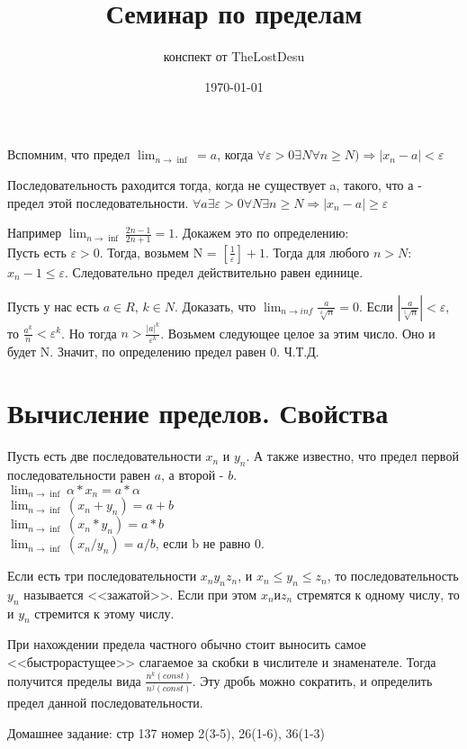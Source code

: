 \documentclass[a4paper,12pt]{article}
\author{конспект от TheLostDesu}
\title{Семинар по пределам}
\date{\today}
\begin{document}
\maketitle
Вспомним, что предел $\lim_{n \to \inf} = a$, когда $\forall \varepsilon > 0 \exists N \forall n \geq N)\Rightarrow  |x_n - a|<\varepsilon$ 

Последовательность раходится тогда, когда не существует a, такого, что а - предел этой последовательности. $\forall a \exists \varepsilon > 0 \forall N \exists n \geq N \Rightarrow |x_n - a| \geq \varepsilon$

Например $\lim_{n \to \inf} \frac{2n - 1}{2n + 1} = 1$. Докажем это по определению:\\
Пусть есть $\varepsilon > 0$.  Тогда, возьмем N = $\left[ \frac{1}{\varepsilon} \right] + 1$. Тогда для любого $n > N$: $x_n - 1 \leq \varepsilon$. Следовательно предел действительно равен единице.

Пусть у нас есть $a \in R$, $k \in N$. Доказать, что $\lim_{n \to inf} \frac{a}{\sqrt[k]{n}} = 0$. Если $|\frac{a}{\sqrt[5]{n}}| < \varepsilon$, то $\frac{a^k}{n} < \varepsilon ^ k$. Но тогда $n > \frac{|a|^k}{\varepsilon ^ k}$. Возьмем следующее целое за этим число. Оно и будет N. Значит, по определению предел равен 0. Ч.Т.Д.

\section*{Вычисление пределов. Свойства}
Пусть есть две последовательности $x_n$ и $y_n$. А также известно, что предел первой последовательности равен $a$, а второй - $b$. \\
$\lim_{n \to \inf} \alpha * x_n = a * \alpha$\\
$\lim_{n \to \inf} (x_n + y_n) = a + b$\\
$\lim_{n \to \inf} (x_n * y_n) = a * b$\\
$\lim_{n \to \inf} (x_n / y_n) = a / b$, если b не равно 0.

Если есть три последовательности $x_n y_n z_n$, и $x_n \leq y_n \leq z_n$, то последовательность $y_n$ называется <<зажатой>>. 	Если при этом $x_n и z_n$ стремятся к одному числу, то и $y_n$ стремится к этому числу.

При нахождении предела частного обычно стоит выносить самое <<быстрорастущее>> слагаемое за скобки в числителе и знаменателе. Тогда получится пределы вида $\frac{n^k(const)}{n^j(const)}$. Эту дробь можно сократить, и определить предел данной последовательности.

Домашнее задание:
стр 137 номер 2(3-5), 26(1-6), 36(1-3)
\end{document}
